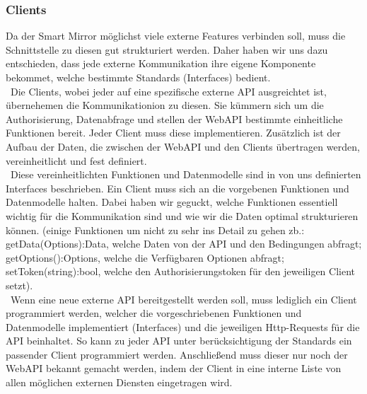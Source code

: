 \subsubsection{Clients}\label{Clients}
Da der Smart Mirror möglichst viele externe Features verbinden soll, muss die Schnittstelle zu diesen gut strukturiert werden. Daher haben wir uns dazu entschieden, dass jede externe Kommunikation ihre eigene Komponente bekommet, welche bestimmte Standards (Interfaces) bedient.\\\
Die Clients, wobei jeder auf eine spezifische externe API ausgreichtet ist, übernehemen die Kommunikationion zu diesen. Sie kümmern sich um die Authorisierung, Datenabfrage und stellen der WebAPI bestimmte einheitliche Funktionen bereit. Jeder Client muss diese implementieren. Zusätzlich ist der Aufbau der Daten, die zwischen der WebAPI und den Clients übertragen werden, vereinheitlicht und fest definiert.\\\
Diese vereinheitlichten Funktionen und Datenmodelle sind in von uns definierten Interfaces beschrieben. Ein Client muss sich an die vorgebenen Funktionen und Datenmodelle halten. Dabei haben wir geguckt, welche Funktionen essentiell wichtig für die Kommunikation sind und wie wir die Daten optimal strukturieren können. (einige Funktionen um nicht zu sehr ins Detail zu gehen zb.: getData(Options):Data, welche Daten von der API und den Bedingungen abfragt; getOptions():Options, welche die Verfügbaren Optionen abfragt; setToken(string):bool, welche den Authorisierungstoken für den jeweiligen Client setzt).\\\
Wenn eine neue externe API bereitgestellt werden soll, muss lediglich ein Client programmiert werden, welcher die vorgeschriebenen Funktionen und Datenmodelle implementiert (Interfaces) und die jeweiligen Http-Requests für die API beinhaltet. So kann zu jeder API unter berücksichtigung der Standards ein passender Client programmiert werden. Anschließend muss dieser nur noch der WebAPI bekannt gemacht werden, indem der Client in eine interne Liste von allen möglichen externen Diensten eingetragen wird.\\\

